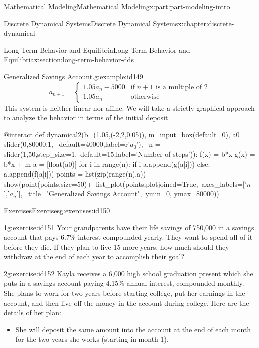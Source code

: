 \documentclass[oneside,10pt,]{book}
\numberwithin{equation}{section}
\newcommand{\amp}{&}
\begin{document}
\begin{partptx}{Mathematical Modeling}{}{Mathematical Modeling}{}{}{x:part:part-modeling-intro}
\begin{chapterptx}{Discrete Dynamical Systems}{}{Discrete Dynamical Systems}{}{}{x:chapter:discrete-dynamical}
\begin{sectionptx}{Long-Term Behavior and Equilibria}{}{Long-Term Behavior and Equilibria}{}{}{x:section:long-term-behavior-dds}
\begin{example}{Generalized Savings Account.}{g:example:id149}
\begin{equation*}
a_{n+1} = \begin{cases}
1.05a_n - 5000 \amp \text{if $n+1$ is a multiple of 2} \\
1.05a_n \amp \text{otherwise}
\end{cases}
\end{equation*}
This system is neither linear nor affine.  We will take a strictly graphical approach to analyze the behavior in terms of the initial deposit.%
\begin{sageinput}
@interact
def dynamical2(b=(1.05,(-2,2,0.05)), m=input_box(default=0), 
              a0 = slider(0,80000,1, \
              default=40000,label=r'\(a_0\)'), \
              n = slider(1,50,step_size=1,\
              default=15,label='Number of steps')):
    f(x) = b*x
    g(x) = b*x + m
    a = [float(a0)]
    for i in range(n):
        if i%
            a.append(g(a[i]))
        else:
            a.append(f(a[i]))
    points = list(zip(range(n),a))
    show(point(points,size=50)+\
         list_plot(points,plotjoined=True,\
         axes_labels=['$n$','$a_n$'], \
         title="Generalized Savings Account",\
         ymin=0, ymax=80000))
\end{sageinput}
\end{example}
%
%
\typeout{************************************************}
\typeout{Exercises 8.2 Exercises}
\typeout{************************************************}
%
\begin{exercises-subsection-numberless}{Exercises}{}{Exercises}{}{}{g:exercises:id150}
\begin{divisionexercise}{1}{}{}{g:exercise:id151}%
Your grandparents have their life savings of \textdollar{}750,000 in a savings account that pays 6.7\% interest compounded yearly. They want to spend all of it before they die. If they plan to live 15 more years, how much should they withdraw at the end of each year to accomplish their goal?%
\end{divisionexercise}%
\begin{divisionexercise}{2}{}{}{g:exercise:id152}%
Kayla receives a \textdollar{}6,000 high school graduation present which she puts in a savings account paying 4.15\% annual interest, compounded monthly. She plans to work for two years before starting college, put her earnings in the account, and then live off the money in the account during college. Here are the details of her plan:%
%
\begin{itemize}[label=\textbullet]
\item{}She will deposit the same amount into the account at the end of each month for the two years she works (starting in month 1).%

\end{itemize}
\end{divisionexercise}
\end{exercises-subsection-numberless}
\end{sectionptx}
\end{chapterptx}
\end{partptx}
\end{document}
